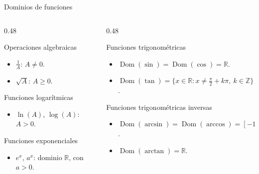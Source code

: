 \documentclass[main.tex]{subfiles}
\begin{document}
\begin{frame}{Dominios de funciones}
  \footnotesize

  \begin{columns}[T,onlytextwidth]
    \begin{column}{0.48\textwidth}
      \begin{block}{Operaciones algebraicas}
        \begin{itemize}
          \item $\displaystyle\frac{1}{A}$: $A\neq 0$.
          \item $\sqrt{A}$: $A\geq 0$.
        \end{itemize}
      \end{block}

      \begin{block}{Funciones logarítmicas}
        \begin{itemize}
          \item $\ln(A)$, $\log(A)$: $A>0$.
        \end{itemize}
      \end{block}

      \begin{block}{Funciones exponenciales}
        \begin{itemize}
          \item $e^x$, $a^x$: dominio $\mathbb{R}$, con $a>0$.
        \end{itemize}
      \end{block}
    \end{column}
    \begin{column}{0.48\textwidth}
      \begin{block}{Funciones trigonométricas}
        \begin{itemize}
          \item $\operatorname{Dom}(\sin)=\operatorname{Dom}(\cos)=\mathbb{R}$.
          \item $\displaystyle\operatorname{Dom}(\tan)
                =\bigl\{x\in\mathbb{R}:x\neq\tfrac{\pi}{2}+k\pi,
                \ k\in\mathbb{Z}\bigr\}$.
        \end{itemize}
      \end{block}

      \begin{block}{Funciones trigonométricas inversas}
        \begin{itemize}
          \item $\operatorname{Dom}(\arcsin)=\operatorname{Dom}(\arccos)
                =[-1,1]$.
          \item $\operatorname{Dom}(\arctan)=\mathbb{R}$.
        \end{itemize}
      \end{block}
    \end{column}
  \end{columns}


\end{frame}
\end{document}
